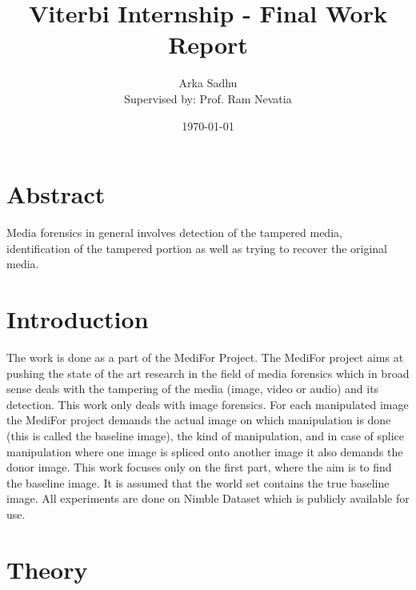 \documentclass{article}
\title{Viterbi Internship - Final Work Report}
\author{Arka Sadhu\\{ Supervised by: Prof. Ram Nevatia}}
\date{\today}
\begin{document}
\maketitle

\tableofcontents
\newpage
\section{Abstract}
Media forensics in general involves detection of the tampered media, identification of the tampered portion as well as trying to recover the original media.


\section{Introduction}
The work is done as a part of the MediFor Project. The MediFor project aims at pushing the state of the art research in the field of media forensics which in broad sense deals with the tampering of the media (image, video or audio) and its detection. This work only deals with image forensics. For each manipulated image the MediFor project demands the actual image on which manipulation is done (this is called the baseline image), the kind of manipulation, and in case of splice manipulation where one image is spliced onto another image it also demands the donor image. This work focuses only on the first part, where the aim is to find the baseline image. It is assumed that the world set contains the true baseline image. All experiments are done on Nimble Dataset which is publicly available for use.

\section{Theory}
\end{document}
